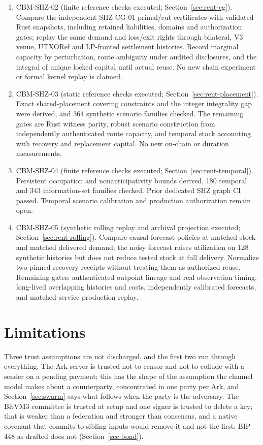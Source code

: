 \documentclass[11pt]{article}
\theoremstyle{plain}
\theoremstyle{definition}
\theoremstyle{remark}
\begin{document}
\begin{enumerate}[leftmargin=*,itemsep=2pt]
\item CBM-SHZ-02 (finite reference checks executed; Section~\ref{sec:rent-cg}). Compare the independent SHZ-CG-01 primal/cut certificates with validated Rust snapshots, including retained liabilities, domains and authorization gates; replay the same demand and loss/exit rights through bilateral, V3 venue, UTXORef and LP-fronted settlement histories. Record marginal capacity by perturbation, route ambiguity under audited disclosures, and the integral of unique locked capital until actual reuse. No new chain experiment or formal kernel replay is claimed.
\item CBM-SHZ-03 (static reference checks executed; Section~\ref{sec:rent-placement}). Exact shared-placement covering constraints and the integer integrality gap were derived, and 364 synthetic scenario families checked. The remaining gates are Rust witness parity, robust scenario construction from independently authenticated route capacity, and temporal stock accounting with recovery and replacement capital. No new on-chain or duration measurements.
\item CBM-SHZ-04 (finite reference checks executed; Section~\ref{sec:rent-temporal}). Persistent occupation and nonanticipativity bounds derived, 180 temporal and 343 information-set families checked. Prior dedicated SHZ graph CI passed. Temporal scenario calibration and production authorization remain open.
\item CBM-SHZ-05 (synthetic rolling replay and archival projection executed; Section~\ref{sec:rent-rolling}). Compare causal forecast policies at matched stock and matched delivered demand; the noisy forecast raises utilization on 128 synthetic histories but does not reduce tested stock at full delivery. Normalize two pinned recovery receipts without treating them as authorized reuse. Remaining gates: authenticated outpoint lineage and real observation timing, long-lived overlapping histories and costs, independently calibrated forecasts, and matched-service production replay.
\end{enumerate}

\section{Limitations}
\label{sec:limits}

Three trust assumptions are not discharged, and the first two run through everything. The Ark server is trusted not to censor and not to collude with a sender on a pending payment; this has the shape of the assumption the channel model makes about a counterparty, concentrated in one party per Ark, and Section~\ref{sec:swarm} says what follows when the party is the adversary. The BitVM3 committee is trusted at setup and one signer is trusted to delete a key; that is weaker than a federation and stronger than consensus, and a native covenant that commits to sibling inputs would remove it and not the first; BIP 448 as drafted does not (Section~\ref{sec:bond}).
\end{document}
